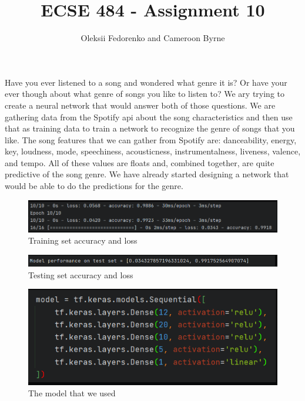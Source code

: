 \documentclass[12pt, oneside, a4paper]{article}
\begin{document}
 
    \title{\textbf{ECSE 484 - Assignment 10}}
    \author{Oleksii Fedorenko and Cameroon Byrne}
    \maketitle
    
    Have you ever listened to a song and wondered what genre it is? Or have your ever though about what genre of songs you like to listen to? We ary trying to create a neural network that would answer both of those questions. We are gathering data from the Spotify api about the song characteristics and then use that as training data to train a network to recognize the genre of songs that you like. The song features that we can gather from Spotify are: danceability, energy, key, loudness, mode, speechiness, acousticness, instrumentalness, liveness, valence, and tempo. All of these values are floats and, combined together, are quite predictive of the song genre. We have already started designing a network that would be able to do the predictions for the genre. 

    \FloatBarrier 
    \begin{figure}[H]
        \caption{Training set accuracy and loss} 
        \centerline{
        \includegraphics[width=\textwidth]{tarining_set_loss_acc.PNG}
        } 
    \end{figure}

    
    \FloatBarrier 
    \begin{figure}[H]
        \caption{Testing set accuracy and loss} 
        \centerline{
        \includegraphics[width=\textwidth]{test_set.PNG}
        } 
    \end{figure}
    
    \FloatBarrier 
    \begin{figure}[H]
        \caption{The model that we used} 
        \centerline{
        \includegraphics[width=\textwidth]{model.PNG}
        } 
    \end{figure}
\end{document}
